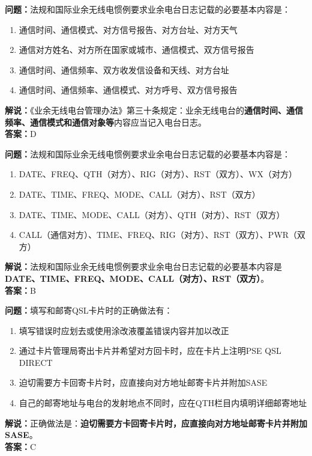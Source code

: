 \noindent\textbf{问题：}法规和国际业余无线电惯例要求业余电台日志记载的必要基本内容是：
\begin{enumerate}[label=\Alph*), leftmargin=3em]
	\item 通信时间、通信模式、对方信号报告、对方台址、对方天气
	\item 通信对方姓名、对方所在国家或城市、通信模式、双方信号报告
	\item 通信时间、通信频率、双方收发信设备和天线、对方台址
	\item 通信时间、通信频率、通信模式、对方呼号、双方信号报告
\end{enumerate}
\noindent\textbf{解说：}《业余无线电台管理办法》第三十条规定：业余无线电台的\textbf{通信时间、通信频率、通信模式和通信对象等}内容应当记入电台日志。\\\noindent\textbf{答案：}D



\bigskip


\noindent\textbf{问题：}法规和国际业余无线电惯例要求业余电台日志记载的必要基本内容是：
\begin{enumerate}[label=\Alph*), leftmargin=3em]
	\item DATE、FREQ、QTH（对方）、RIG（对方）、RST（双方）、WX（对方）
	\item DATE、TIME、FREQ、MODE、CALL（对方）、RST（双方）
	\item DATE、TIME、MODE、CALL（对方）、QTH（对方）、RST（双方）
	\item CALL（通信对方）、TIME、FREQ、RIG（对方）、RST（双方）、PWR（双方）
\end{enumerate}
\noindent\textbf{解说：}法规和国际业余无线电惯例要求业余电台日志记载的必要基本内容是\textbf{DATE、TIME、FREQ、MODE、CALL（对方）、RST（双方）}。\\\noindent\textbf{答案：}B



\bigskip


\noindent\textbf{问题：}填写和邮寄QSL卡片时的正确做法有：
\begin{enumerate}[label=\Alph*), leftmargin=3em]
	\item 填写错误时应划去或使用涂改液覆盖错误内容并加以改正
	\item 通过卡片管理局寄出卡片并希望对方回卡时，应在卡片上注明PSE QSL DIRECT
	\item 迫切需要方卡回寄卡片时，应直接向对方地址邮寄卡片并附加SASE
	\item 自己的邮寄地址与电台的发射地点不同时，应在QTH栏目内填明详细邮寄地址
\end{enumerate}
\noindent\textbf{解说：}正确做法是：\textbf{迫切需要方卡回寄卡片时，应直接向对方地址邮寄卡片并附加SASE}。\\\noindent\textbf{答案：}C



